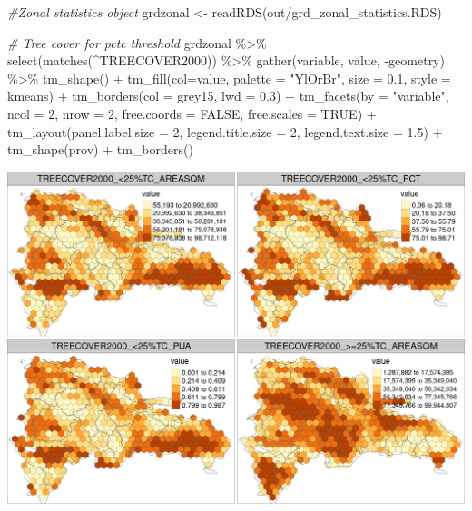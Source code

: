 \documentclass[10pt,landscape,a3paper]{article}
\newenvironment{Shaded}{\begin{snugshade}}{\end{snugshade}}
\newcommand{\AttributeTok}[1]{\textcolor[rgb]{0.77,0.63,0.00}{#1}}
\newcommand{\CommentTok}[1]{\textcolor[rgb]{0.56,0.35,0.01}{\textit{#1}}}
\newcommand{\ConstantTok}[1]{\textcolor[rgb]{0.00,0.00,0.00}{#1}}
\newcommand{\DecValTok}[1]{\textcolor[rgb]{0.00,0.00,0.81}{#1}}
\newcommand{\FloatTok}[1]{\textcolor[rgb]{0.00,0.00,0.81}{#1}}
\newcommand{\FunctionTok}[1]{\textcolor[rgb]{0.00,0.00,0.00}{#1}}
\newcommand{\NormalTok}[1]{#1}
\newcommand{\OtherTok}[1]{\textcolor[rgb]{0.56,0.35,0.01}{#1}}
\newcommand{\SpecialCharTok}[1]{\textcolor[rgb]{0.00,0.00,0.00}{#1}}
\newcommand{\StringTok}[1]{\textcolor[rgb]{0.31,0.60,0.02}{#1}}
\begin{document}
\begin{Shaded}
\begin{Highlighting}[]
\CommentTok{\#Zonal statistics object}
\NormalTok{grdzonal }\OtherTok{\textless{}{-}} \FunctionTok{readRDS}\NormalTok{(}\StringTok{\textquotesingle{}out/grd\_zonal\_statistics.RDS\textquotesingle{}}\NormalTok{)}

\CommentTok{\# Tree cover for pctc threshold}
\NormalTok{grdzonal }\SpecialCharTok{\%\textgreater{}\%} \FunctionTok{select}\NormalTok{(}\FunctionTok{matches}\NormalTok{(}\StringTok{\textquotesingle{}\^{}TREECOVER2000\textquotesingle{}}\NormalTok{)) }\SpecialCharTok{\%\textgreater{}\%}
  \FunctionTok{gather}\NormalTok{(variable, value, }\SpecialCharTok{{-}}\NormalTok{geometry) }\SpecialCharTok{\%\textgreater{}\%}
  \FunctionTok{tm\_shape}\NormalTok{() }\SpecialCharTok{+}
  \FunctionTok{tm\_fill}\NormalTok{(}\AttributeTok{col=}\StringTok{\textquotesingle{}value\textquotesingle{}}\NormalTok{, }\AttributeTok{palette =} \StringTok{"YlOrBr"}\NormalTok{, }\AttributeTok{size =} \FloatTok{0.1}\NormalTok{, }\AttributeTok{style =} \StringTok{\textquotesingle{}kmeans\textquotesingle{}}\NormalTok{) }\SpecialCharTok{+}
  \FunctionTok{tm\_borders}\NormalTok{(}\AttributeTok{col =} \StringTok{\textquotesingle{}grey15\textquotesingle{}}\NormalTok{, }\AttributeTok{lwd =} \FloatTok{0.3}\NormalTok{) }\SpecialCharTok{+}
  \FunctionTok{tm\_facets}\NormalTok{(}\AttributeTok{by =} \StringTok{"variable"}\NormalTok{, }\AttributeTok{ncol =} \DecValTok{2}\NormalTok{, }\AttributeTok{nrow =} \DecValTok{2}\NormalTok{, }\AttributeTok{free.coords =} \ConstantTok{FALSE}\NormalTok{, }\AttributeTok{free.scales =} \ConstantTok{TRUE}\NormalTok{) }\SpecialCharTok{+}
  \FunctionTok{tm\_layout}\NormalTok{(}\AttributeTok{panel.label.size =} \DecValTok{2}\NormalTok{, }\AttributeTok{legend.title.size =} \DecValTok{2}\NormalTok{, }\AttributeTok{legend.text.size =} \FloatTok{1.5}\NormalTok{) }\SpecialCharTok{+}
  \FunctionTok{tm\_shape}\NormalTok{(prov) }\SpecialCharTok{+} \FunctionTok{tm\_borders}\NormalTok{()}
\end{Highlighting}
\end{Shaded}

\begin{center}\includegraphics{img/data-download-preparation-eda/zonal-long-term-grid-1} \end{center}
\end{document}
